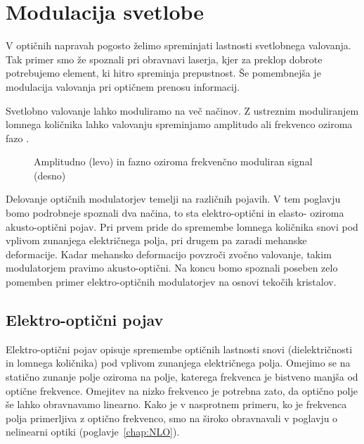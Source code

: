 
\chapter{Modulacija svetlobe}

V optičnih napravah pogosto želimo spreminjati lastnosti svetlobnega
valovanja. Tak primer smo že spoznali pri obravnavi laserja, kjer za 
preklop dobrote potrebujemo element, ki hitro spreminja prepustnost. 
Še pomembnejša je modulacija valovanja pri optičnem prenosu informacij.

Svetlobno valovanje lahko moduliramo na več načinov. Z ustreznim moduliranjem
lomnega količnika lahko valovanju spreminjamo amplitudo 
ali frekvenco oziroma fazo
. 
\begin{figure}[h]
\centering
\def\svgwidth{140truemm} 

\caption{Amplitudno (levo) in fazno oziroma frekvenčno moduliran signal (desno)
}
\label{fig:amfm}
\end{figure}

Delovanje optičnih modulatorjev temelji na različnih pojavih. V tem poglavju bomo 
podrobneje spoznali dva načina, to sta elektro-optični in elasto- oziroma akusto-optični pojav. 
Pri prvem pride do spremembe lomnega količnika snovi pod vplivom zunanjega električnega polja, 
pri drugem pa zaradi mehanske deformacije. Kadar mehansko deformacijo povzroči zvočno valovanje, 
takim modulatorjem pravimo akusto-optični. Na koncu bomo spoznali poseben zelo pomemben 
primer elektro-optičnih modulatorjev na osnovi tekočih kristalov.

\section{Elektro-optični pojav}
Elektro-optični pojav opisuje spremembe optičnih lastnosti 
snovi (dielektričnosti in lomnega količnika) pod vplivom zunanjega električnega polja. 
Omejimo se na statično zunanje polje oziroma
na polje, katerega frekvenca je bistveno manjša od optične frekvence. Omejitev na nizko 
frekvenco je potrebna zato, da optično polje še lahko obravnavamo linearno. 
Kako je v nasprotnem primeru, ko je frekvenca polja primerljiva z optično frekvenco, 
smo na široko obravnavali v poglavju o nelinearni optiki (poglavje~\ref{chap:NLO}).

